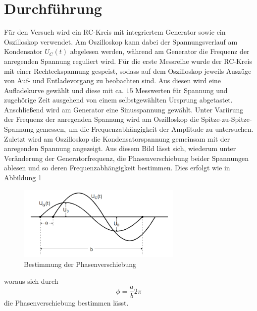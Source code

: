\section{Durchführung}
Für den Versuch wird ein RC-Kreis mit integriertem Generator sowie ein Oszilloskop verwendet. Am Oszilloskop kann dabei der
Spannungsverlauf am Kondensator $U_C(t)$ abgelesen werden, während am Generator die Frequenz der anregenden Spannung reguliert wird.
Für die erste Messreihe wurde der RC-Kreis mit einer Rechteckspannung gespeist, sodass auf dem Oszilloskop jeweils Auszüge von Auf- und Entladevorgang 
zu beobachten sind. Aus diesen wird eine Aufladekurve gewählt und diese mit ca. $15$ Messwerten für Spannung und zugehörige Zeit ausgehend von einem 
selbstgewählten Ursprung abgetastet. \\
Anschließend wird am Generator eine Sinusspannung gewählt. Unter Variirung der Frequenz der anregenden Spannung wird am Oszilloskop
die Spitze-zu-Spitze-Spannung gemessen, um die Frequenzabhängigkeit der Amplitude zu untersuchen. \\
Zuletzt wird am Oszilloskop die Kondensatorspannung gemeinsam mit der anregenden Spannung angezeigt. Aus diesem Bild lässt sich, wiederum
unter Veränderung der Generatorfrequenz, die Phasenverschiebung beider Spannungen ablesen und so deren Frequenzabhängigkeit bestimmen.
Dies erfolgt wie in Abbildung \ref{fig:Phasenverschiebung} 
\begin{figure}
\centering
\includegraphics[width=8cm, keepaspectratio]{Phasenverschiebung}
\caption{Bestimmung der Phasenverschiebung}
\label{fig:Phasenverschiebung}
\end{figure}
woraus sich durch
\begin{equation}
\phi=\frac{a}{b}2\pi
\end{equation}
die Phasenverschiebung bestimmen lässt.

